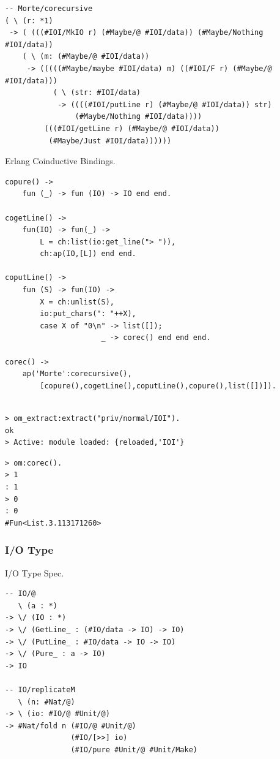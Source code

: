 \documentclass{aip-cp}
\begin{document}
\begin{lstlisting}[mathescape=true]
-- Morte/corecursive
( \ (r: *1)
 -> ( (((#IOI/MkIO r) (#Maybe/@ #IOI/data)) (#Maybe/Nothing #IOI/data))
    ( \ (m: (#Maybe/@ #IOI/data))
     -> (((((#Maybe/maybe #IOI/data) m) ((#IOI/F r) (#Maybe/@ #IOI/data)))
           ( \ (str: #IOI/data)
            -> ((((#IOI/putLine r) (#Maybe/@ #IOI/data)) str)
                (#Maybe/Nothing #IOI/data))))
         (((#IOI/getLine r) (#Maybe/@ #IOI/data))
          (#Maybe/Just #IOI/data))))))
\end{lstlisting}

Erlang Coinductive Bindings.

\begin{lstlisting}[mathescape=true]
copure() ->
    fun (_) -> fun (IO) -> IO end end.

cogetLine() ->
    fun(IO) -> fun(_) ->
        L = ch:list(io:get_line("> ")),
        ch:ap(IO,[L]) end end.

coputLine() ->
    fun (S) -> fun(IO) ->
        X = ch:unlist(S),
        io:put_chars(": "++X),
        case X of "0\n" -> list([]);
                      _ -> corec() end end end.

corec() ->
    ap('Morte':corecursive(),
        [copure(),cogetLine(),coputLine(),copure(),list([])]).
\end{lstlisting}

\begin{lstlisting}[mathescape=true]

> om_extract:extract("priv/normal/IOI").
ok
> Active: module loaded: {reloaded,'IOI'}
\end{lstlisting}

\begin{lstlisting}[mathescape=true]
> om:corec().
> 1
: 1
> 0
: 0
#Fun<List.3.113171260>
\end{lstlisting}

\subsubsection{I/O Type}

I/O Type Spec.

\begin{lstlisting}[mathescape=true]
-- IO/@
   \ (a : *)
-> \/ (IO : *)
-> \/ (GetLine_ : (#IO/data -> IO) -> IO)
-> \/ (PutLine_ : #IO/data -> IO -> IO)
-> \/ (Pure_ : a -> IO)
-> IO

-- IO/replicateM
   \ (n: #Nat/@)
-> \ (io: #IO/@ #Unit/@)
-> #Nat/fold n (#IO/@ #Unit/@)
               (#IO/[>>] io)
               (#IO/pure #Unit/@ #Unit/Make)
\end{lstlisting}
\end{document}
